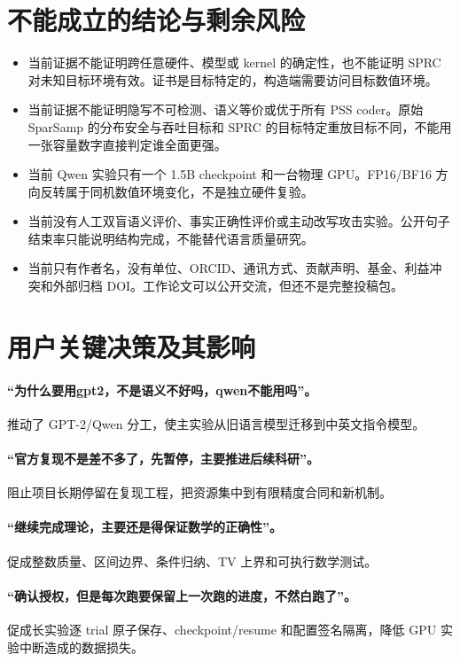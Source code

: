 \documentclass[12pt,a4paper]{article}
\begin{document}
\section{不能成立的结论与剩余风险}

\begin{itemize}
\item 当前证据不能证明跨任意硬件、模型或 kernel 的确定性，也不能证明 SPRC 对未知目标环境有效。证书是目标特定的，构造端需要访问目标数值环境。
\item 当前证据不能证明隐写不可检测、语义等价或优于所有 PSS coder。原始 SparSamp 的分布安全与吞吐目标和 SPRC 的目标特定重放目标不同，不能用一张容量数字直接判定谁全面更强。
\item 当前 Qwen 实验只有一个 1.5B checkpoint 和一台物理 GPU。FP16/BF16 方向反转属于同机数值环境变化，不是独立硬件复验。
\item 当前没有人工双盲语义评价、事实正确性评价或主动改写攻击实验。公开句子结束率只能说明结构完成，不能替代语言质量研究。
\item 当前只有作者名，没有单位、ORCID、通讯方式、贡献声明、基金、利益冲突和外部归档 DOI。工作论文可以公开交流，但还不是完整投稿包。
\end{itemize}

\section{用户关键决策及其影响}

\paragraph{“为什么要用gpt2，不是语义不好吗，qwen不能用吗”。} 推动了 GPT-2/Qwen 分工，使主实验从旧语言模型迁移到中英文指令模型。

\paragraph{“官方复现不是差不多了，先暂停，主要推进后续科研”。} 阻止项目长期停留在复现工程，把资源集中到有限精度合同和新机制。

\paragraph{“继续完成理论，主要还是得保证数学的正确性”。} 促成整数质量、区间边界、条件归纳、TV 上界和可执行数学测试。

\paragraph{“确认授权，但是每次跑要保留上一次跑的进度，不然白跑了”。} 促成长实验逐 trial 原子保存、checkpoint/resume 和配置签名隔离，降低 GPU 实验中断造成的数据损失。
\end{document}
